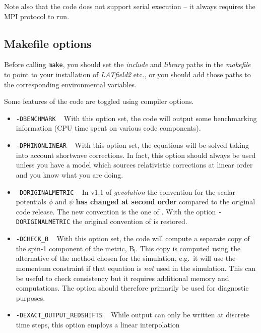 \documentclass[a4paper,10pt]{article}
\begin{document}
\noindent Note also that the code does not support serial execution -- it always requires the MPI protocol to run.

\subsection{Makefile options}

Before calling \texttt{make}, you should set the \textit{include} and \textit{library} paths in the \textit{makefile} to point to your installation of \textit{LATfield2} etc., or you should add those paths to the corresponding environmental variables.

Some features of the code are toggled using compiler options.

\begin{itemize}
 \item[] \hspace{-25pt}\texttt{-DBENCHMARK} ~ With this option set, the code will output some benchmarking information (CPU time spent on various code components).
 \item[] \hspace{-25pt}\texttt{-DPHINONLINEAR} ~ With this option set, the equations will be solved taking into account shortwave corrections. In fact, this option should always be used unless you have a model which sources relativistic corrections at linear order and you know what you are doing.
 \item[] \hspace{-25pt}\texttt{-DORIGINALMETRIC} ~ In v1.1 of \textit{gevolution} the convention for the scalar potentials $\mathsf{\phi}$ and $\mathsf{\psi}$ \textbf{has changed at second order} compared to the original code release. The new convention is the one of \cite{Adamek:2017grt}. With the option \texttt{-DORIGINALMETRIC} the original convention of \cite{Adamek:2016zes} is restored.
 \item[] \hspace{-25pt}\texttt{-DCHECK\_B} ~ With this option set, the code will compute a separate copy of the spin-1 component of the
 metric, B$_\mathsf{i}$. This copy is computed using the alternative of the method chosen for the simulation, e.g.\ it will use the
 momentum constraint if that equation is \textit{not} used in the simulation. This can be useful to check consistency but it requires
 additional memory and computations. The option should therefore primarily be used for diagnostic purposes.
 \item[] \hspace{-25pt}\texttt{-DEXACT\_OUTPUT\_REDSHIFTS} ~ While output can only be written at discrete time steps, this option employs a linear interpolation

\end{itemize}
\end{document}
